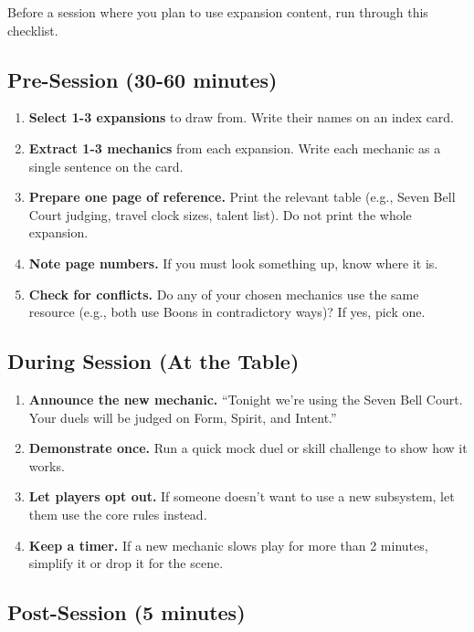 Before a session where you plan to use expansion content, run through this checklist.

\subsection{Pre-Session (30-60 minutes)}

\begin{enumerate}
\item \textbf{Select 1-3 expansions} to draw from. Write their names on an index card.
\item \textbf{Extract 1-3 mechanics} from each expansion. Write each mechanic as a single sentence on the card.
\item \textbf{Prepare one page of reference.} Print the relevant table (e.g., Seven Bell Court judging, travel clock sizes, talent list). Do not print the whole expansion.
\item \textbf{Note page numbers.} If you must look something up, know where it is.
\item \textbf{Check for conflicts.} Do any of your chosen mechanics use the same resource (e.g., both use Boons in contradictory ways)? If yes, pick one.
\end{enumerate}

\subsection{During Session (At the Table)}

\begin{enumerate}
\item \textbf{Announce the new mechanic.} “Tonight we're using the Seven Bell Court. Your duels will be judged on Form, Spirit, and Intent.”
\item \textbf{Demonstrate once.} Run a quick mock duel or skill challenge to show how it works.
\item \textbf{Let players opt out.} If someone doesn't want to use a new subsystem, let them use the core rules instead.
\item \textbf{Keep a timer.} If a new mechanic slows play for more than 2 minutes, simplify it or drop it for the scene.
\end{enumerate}

\subsection{Post-Session (5 minutes)}

